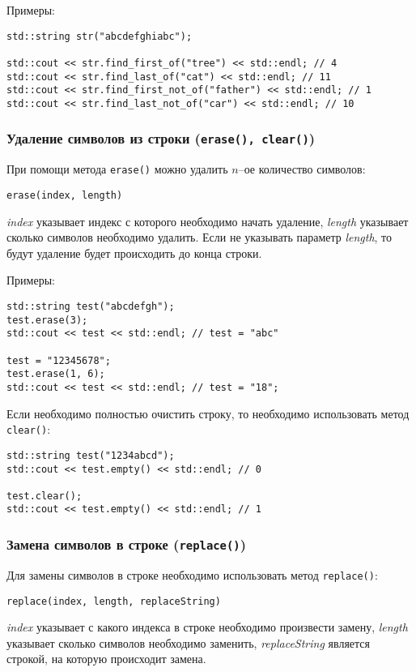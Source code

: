 Примеры:
\begin{lstlisting}
std::string str("abcdefghiabc");

std::cout << str.find_first_of("tree") << std::endl; // 4
std::cout << str.find_last_of("cat") << std::endl; // 11
std::cout << str.find_first_not_of("father") << std::endl; // 1
std::cout << str.find_last_not_of("car") << std::endl; // 10
\end{lstlisting}

\subsubsection{Удаление символов из строки (\texttt{erase(), clear()})}

При помощи метода \lstinline|erase()| можно удалить $n$--ое количество символов:

\lstinline|erase(index, length)|

\textit{index} указывает индекс с которого необходимо начать удаление, \textit{length} указывает сколько символов необходимо удалить. Если не указывать параметр \textit{length}, то будут удаление будет происходить до конца строки.

Примеры:
\begin{lstlisting}
std::string test("abcdefgh");
test.erase(3);
std::cout << test << std::endl; // test = "abc"

test = "12345678";
test.erase(1, 6);
std::cout << test << std::endl; // test = "18";
\end{lstlisting} 

Если необходимо полностью очистить строку, то необходимо использовать метод \lstinline|clear()|:
\begin{lstlisting}
std::string test("1234abcd");
std::cout << test.empty() << std::endl; // 0

test.clear();
std::cout << test.empty() << std::endl; // 1
\end{lstlisting}

\subsubsection{Замена символов в строке (\texttt{replace()})}

Для замены символов в строке необходимо использовать метод \lstinline|replace()|:

\lstinline|replace(index, length, replaceString)|

\textit{index} указывает с какого индекса в строке необходимо произвести замену, \textit{length} указывает сколько символов необходимо заменить, \textit{replaceString} является строкой, на которую происходит замена.

